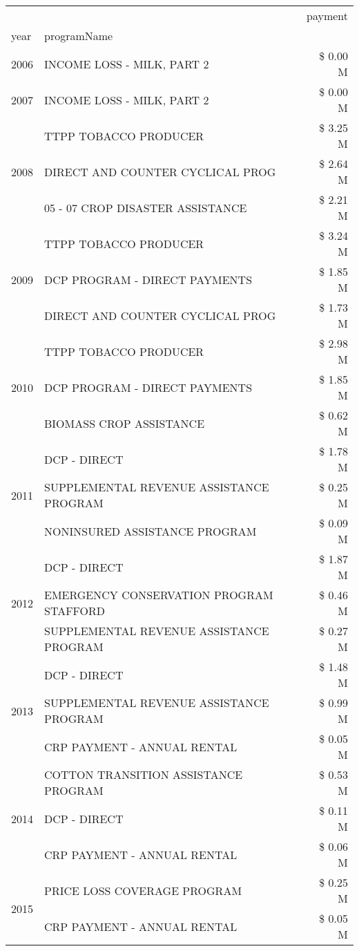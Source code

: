\begin{tabular}{llr}
\toprule
 &  & payment \\
year & programName &  \\
\midrule
2006 & INCOME LOSS - MILK, PART 2 & \$ 0.00 M \\
\cline{1-3}
2007 & INCOME LOSS - MILK, PART 2 & \$ 0.00 M \\
\cline{1-3}
\multirow[t]{3}{*}{2008} & TTPP TOBACCO PRODUCER & \$ 3.25 M \\
 & DIRECT AND COUNTER CYCLICAL PROG & \$ 2.64 M \\
 & 05 - 07 CROP DISASTER ASSISTANCE & \$ 2.21 M \\
\cline{1-3}
\multirow[t]{3}{*}{2009} & TTPP TOBACCO PRODUCER & \$ 3.24 M \\
 & DCP PROGRAM - DIRECT PAYMENTS & \$ 1.85 M \\
 & DIRECT AND COUNTER CYCLICAL PROG & \$ 1.73 M \\
\cline{1-3}
\multirow[t]{3}{*}{2010} & TTPP TOBACCO PRODUCER & \$ 2.98 M \\
 & DCP PROGRAM - DIRECT PAYMENTS & \$ 1.85 M \\
 & BIOMASS CROP ASSISTANCE & \$ 0.62 M \\
\cline{1-3}
\multirow[t]{3}{*}{2011} & DCP - DIRECT & \$ 1.78 M \\
 & SUPPLEMENTAL REVENUE ASSISTANCE PROGRAM & \$ 0.25 M \\
 & NONINSURED ASSISTANCE PROGRAM & \$ 0.09 M \\
\cline{1-3}
\multirow[t]{3}{*}{2012} & DCP - DIRECT & \$ 1.87 M \\
 & EMERGENCY CONSERVATION PROGRAM STAFFORD & \$ 0.46 M \\
 & SUPPLEMENTAL REVENUE ASSISTANCE PROGRAM & \$ 0.27 M \\
\cline{1-3}
\multirow[t]{3}{*}{2013} & DCP - DIRECT & \$ 1.48 M \\
 & SUPPLEMENTAL REVENUE ASSISTANCE PROGRAM & \$ 0.99 M \\
 & CRP PAYMENT - ANNUAL RENTAL & \$ 0.05 M \\
\cline{1-3}
\multirow[t]{3}{*}{2014} & COTTON TRANSITION ASSISTANCE PROGRAM & \$ 0.53 M \\
 & DCP - DIRECT & \$ 0.11 M \\
 & CRP PAYMENT - ANNUAL RENTAL & \$ 0.06 M \\
\cline{1-3}
\multirow[t]{3}{*}{2015} & PRICE LOSS COVERAGE PROGRAM & \$ 0.25 M \\
 & CRP PAYMENT - ANNUAL RENTAL & \$ 0.05 M \\

\end{tabular}
